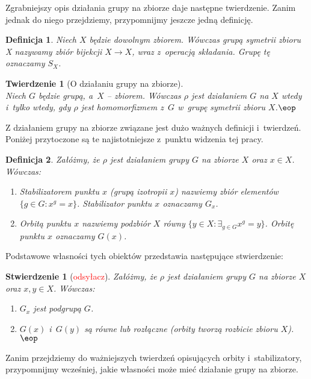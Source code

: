 \documentclass[licencjacka]{pracamgr}
\newtheorem{deff}{Definicja}[section]
\newtheorem{thh}{Twierdzenie}[section]
\newtheorem{fact}{Stwierdzenie}[section]
\begin{document}
Zgrabniejszy opis działania grupy na zbiorze daje następne
twierdzenie. Zanim jednak do niego przejdziemy, przypomnijmy
jeszcze jedną definicję.

\begin{deff}
    Niech $X$ będzie dowolnym zbiorem. Wówczas \emph{grupą symetrii zbioru X} nazywamy zbiór bijekcji $X \to X$,
    wraz z~operacją składania. Grupę tę oznaczamy $S_X$.
\end{deff}

\begin{thh}[O działaniu grupy na zbiorze] $ $ \\
    Niech $G$ będzie grupą, a~$X$ -- zbiorem. Wówczas $\rho$ jest działaniem $G$ na $X$ wtedy i~tylko wtedy,
    gdy $\rho$ jest homomorfizmem z~$G$ w~grupę symetrii zbioru $X$.\quad$\eop$
\end{thh}

Z działaniem grupy na zbiorze związane jest dużo ważnych definicji
i~twierdzeń. Poniżej przytoczone są te najistotniejsze z~punktu
widzenia tej pracy.

\begin{deff}
    Załóżmy, że $\rho$ jest działaniem grupy $G$ na zbiorze $X$ oraz $x \in X$. Wówczas:
    \begin{enumerate}[label=\alph*)]
     \item \emph{Stabilizatorem punktu $x$ (grupą izotropii $x$)} nazwiemy zbiór elementów $\{g \in G\colon x^g = x \}$.
                    Stabilizator punktu $x$ oznaczamy $G_x$.
     \item \emph{Orbitą punktu $x$} nazwiemy podzbiór $X$ równy $\{y \in X \colon \exists_{g \in G} x^g = y \}$.
                    Orbitę punktu $x$ oznaczamy $G(x)$.
    \end{enumerate}
\end{deff}

Podstawowe własności tych obiektów przedstawia następujące stwierdzenie:
\begin{fact} [\textcolor{red}{odsyłacz}]
    Załóżmy, że $\rho$ jest działaniem grupy $G$ na zbiorze $X$ oraz $x, y \in X$. Wówczas:
    \begin{enumerate}[label=\alph*)]
     \item $G_x$ jest podgrupą $G$.
     \item $G(x)$ i~$G(y)$ są równe lub rozłączne (orbity tworzą rozbicie zbioru $X$).\quad$\eop$
    \end{enumerate}
\end{fact}

Zanim przejdziemy do ważniejszych twierdzeń opisujących orbity
i~stabilizatory, przypomnijmy wcześniej, jakie własności może mieć
działanie grupy na zbiorze.
\end{document}
